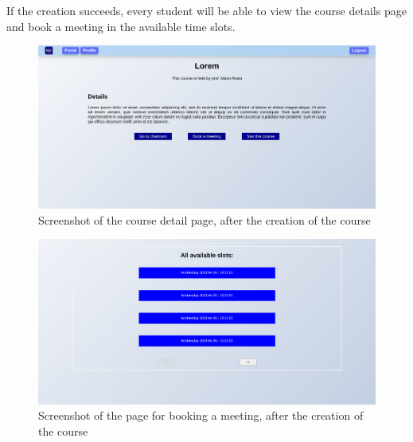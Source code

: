 If the creation succeeds, every student will be able to view the course details page and book a meeting in the available time slots.

\begin{figure}[H]
    \centering
    \includegraphics[width=\textwidth]{img/user_manual/professor/create-course-4.png}
    \caption{Screenshot of the course detail page, after the creation of the course}
\end{figure}

\begin{figure}[H]
    \centering
    \includegraphics[width=\textwidth]{img/user_manual/professor/create-course-5.png}
    \caption{Screenshot of the page for booking a meeting, after the creation of the course}
\end{figure}

